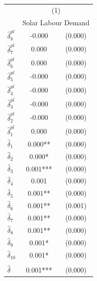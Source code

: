 {
\def\sym#1{\ifmmode^{#1}\else\(^{#1}\)\fi}
\begin{tabular}{l*{1}{cc}}
\toprule
            &\multicolumn{2}{c}{(1)}     \\
            &\multicolumn{2}{c}{Solar Labour Demand}\\
\midrule
$\hat{\delta}_8^{pl}$&      -0.000   &     (0.000)\\
$\hat{\delta}_7^{pl}$&       0.000   &     (0.000)\\
$\hat{\delta}_6^{pl}$&       0.000   &     (0.000)\\
$\hat{\delta}_5^{pl}$&      -0.000   &     (0.000)\\
$\hat{\delta}_4^{pl}$&      -0.000   &     (0.000)\\
$\hat{\delta}_3^{pl}$&      -0.000   &     (0.000)\\
$\hat{\delta}_2^{pl}$&      -0.000   &     (0.000)\\
$\hat{\delta}_1^{pl}$&       0.000   &     (0.000)\\
$\hat{\delta}_1$&       0.000** &     (0.000)\\
$\hat{\delta}_2$&       0.000*  &     (0.000)\\
$\hat{\delta}_3$&       0.001***&     (0.000)\\
$\hat{\delta}_4$&       0.001   &     (0.000)\\
$\hat{\delta}_5$&       0.001** &     (0.000)\\
$\hat{\delta}_6$&       0.001** &     (0.001)\\
$\hat{\delta}_7$&       0.001** &     (0.000)\\
$\hat{\delta}_8$&       0.001** &     (0.000)\\
$\hat{\delta}_9$&       0.001*  &     (0.000)\\
$\hat{\delta}_{10}$&       0.001*  &     (0.000)\\
\addlinespace&               &            \\
$\hat{\delta}$&       0.001***&     (0.000)\\
\bottomrule
\end{tabular}
}
